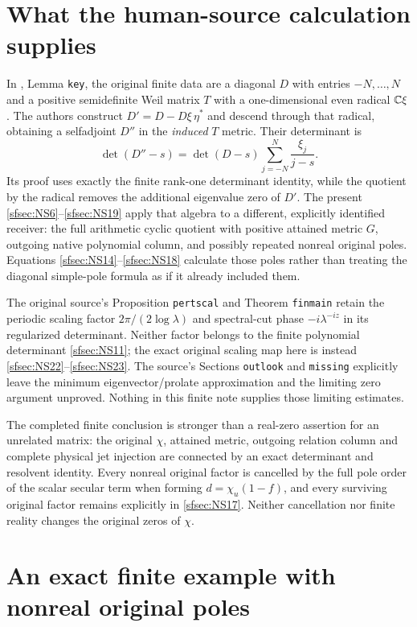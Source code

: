 \documentclass[11pt]{article}
\begin{document}
\section{What the human-source calculation supplies}

In \cite{sfsec:CCM}, Lemma \texttt{key}, the original finite
data are a diagonal $D$ with entries $-N,\ldots,N$ and
a positive semidefinite Weil matrix $T$ with a
one-dimensional even radical $\mathbb C\xi$.
The authors construct $D'=D-D\xi\,\eta^*$ and descend
through that radical, obtaining a selfadjoint $D''$ in
the \emph{induced} $T$ metric. Their determinant is
\[
\det(D''-s)=\det(D-s)\sum_{j=-N}^N\frac{\xi_j}{j-s}.
\]
Its proof uses exactly the finite rank-one determinant
identity, while the quotient by the radical removes
the additional eigenvalue zero of $D'$.
The present \eqref{sfsec:NS6}--\eqref{sfsec:NS19} apply that algebra
to a different, explicitly identified receiver: the
full arithmetic cyclic quotient with positive attained
metric $G$, outgoing native polynomial column, and
possibly repeated nonreal original poles.
Equations \eqref{sfsec:NS14}--\eqref{sfsec:NS18} calculate those
poles rather than treating the diagonal simple-pole
formula as if it already included them.

The original source's Proposition \texttt{pertscal}
and Theorem \texttt{finmain} retain the periodic
scaling factor $2\pi/(2\log\lambda)$ and spectral-cut
phase $-i\lambda^{-iz}$ in its regularized determinant.
Neither factor belongs to the finite polynomial
determinant \eqref{sfsec:NS11}; the exact original scaling
map here is instead \eqref{sfsec:NS22}--\eqref{sfsec:NS23}.
The source's Sections \texttt{outlook} and
\texttt{missing} explicitly leave the minimum
eigenvector/prolate approximation and the limiting
zero argument unproved. Nothing in this finite note
supplies those limiting estimates.

The completed finite conclusion is stronger than a
real-zero assertion for an unrelated matrix: the
original $\chi$, attained metric, outgoing relation
column and complete physical jet injection are
connected by an exact determinant and resolvent
identity. Every nonreal original factor is cancelled
by the full pole order of the scalar secular term
when forming $d=\chi_u(1-f)$, and every
surviving original factor remains explicitly in
\eqref{sfsec:NS17}. Neither cancellation nor finite reality
changes the original zeros of $\chi$.

\section{An exact finite example with nonreal original poles}
\end{document}

